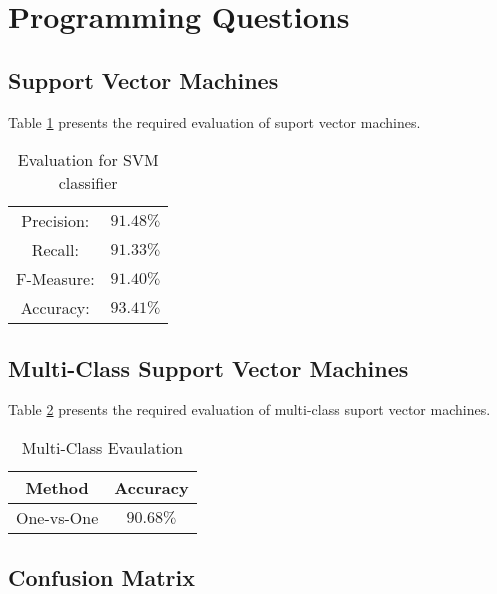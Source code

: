 \documentclass[12pt]{article}
\begin{document}
\maketitle

\newpage
\section{Programming Questions}
\subsection{Support Vector Machines}

\noindent
Table \ref{table:1} presents the required evaluation of suport vector machines.

\begin{table}[h!]
    \centering
    \begin{tabular}{|c|c|}
        \hline
        Precision: & $91.48\%$ \\
        Recall: & $91.33\%$ \\ 
        F-Measure: & $91.40\%$ \\
        Accuracy: & $93.41\%$  \\
        \hline
    \end{tabular}
    \caption{Evaluation for SVM classifier}
    \label{table:1}
\end{table}

\newpage
\subsection{Multi-Class Support Vector Machines}
\label{section:2}
\noindent
Table \ref{table:2} presents the required evaluation of multi-class suport vector machines.

\begin{table}[h!]
    \centering
    \begin{tabular}{|c|c|}
        \hline
        Method & Accuracy \\
        \hline
        One-vs-One & $90.68\%$ \\
        \hline
    \end{tabular}
    \caption{Multi-Class Evaulation}
    \label{table:2}
\end{table}

\newpage
\subsection{Confusion Matrix}
\end{document}
